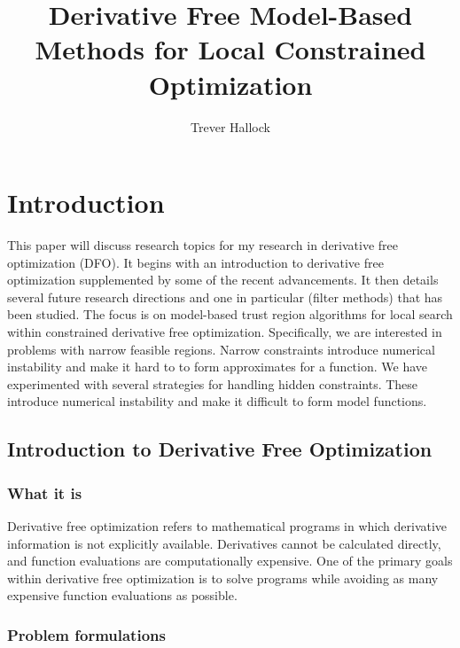 \documentclass{article}
\title{Derivative Free Model-Based Methods for Local Constrained Optimization}
\author{Trever Hallock}
\begin{document}
%
\algnewcommand{\Goto}{\algorithmicgoto\xspace}%
\algnewcommand{\Label}{\State\unskip}


\maketitle


\tableofcontents

\newpage

\section{Introduction}

This paper will discuss research topics for my research in derivative free optimization (DFO).
It begins with an introduction to derivative free optimization supplemented by some of the recent advancements.
It then details several future research directions and one in particular (filter methods) that has been studied.
The focus is on model-based trust region algorithms for local search within constrained derivative free optimization.
Specifically, we are interested in problems with narrow feasible regions.
Narrow constraints introduce numerical instability and make it hard to to form approximates for a function.
We have experimented with several strategies for handling hidden constraints.
These introduce numerical instability and make it difficult to form model functions. 

\subsection{Introduction to Derivative Free Optimization}
\subsubsection{What it is}

Derivative free optimization refers to mathematical programs in which derivative information is not explicitly available.
Derivatives cannot be calculated directly, and function evaluations are computationally expensive.
One of the primary goals within derivative free optimization is to solve programs while avoiding as many expensive function evaluations as possible.


\subsubsection{Problem formulations}
\end{document}
